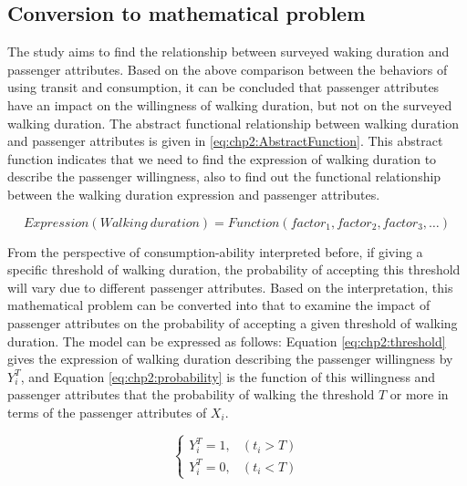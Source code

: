 \subsection{Conversion to mathematical problem}
The study aims to find the relationship between surveyed waking duration and passenger attributes. Based on the above comparison between the behaviors of using transit and consumption, it can be concluded that passenger attributes have an impact on the willingness of walking duration, but not on the surveyed walking duration. The abstract functional relationship between walking duration and passenger attributes is given in \ref{eq:chp2:AbstractFunction}. This abstract function indicates that we need to find the expression of walking duration to describe the passenger willingness, also to find out the functional relationship between the walking duration expression and passenger attributes.

\begin{equation}
Expression(Walking\ duration) = Function({factor}_1, {factor}_2, {factor}_3, \ldots)
\label{eq:chp2:AbstractFunction}
\end{equation}

From the perspective of consumption-ability interpreted before, if giving a specific threshold of walking duration, the probability of accepting this threshold will vary due to different passenger attributes. Based on the interpretation, this mathematical problem can be converted into that to examine the impact of passenger attributes on the probability of accepting a given threshold of walking duration. The model can be expressed as follows: Equation \ref{eq:chp2:threshold} gives the expression of walking duration describing the passenger willingness by $Y^T_i$, and Equation \ref{eq:chp2:probability} is the function of this willingness and passenger attributes that the probability of walking the threshold $T$ or more in terms of the passenger attributes of $X_i$.

\begin{equation}
\left\{\begin{matrix}
Y^T_i=1,&(t_i>T) \\
Y^T_i=0,&(t_i<T)
\end{matrix}\right.
\label{eq:chp2:threshold}
\end{equation}

